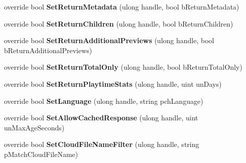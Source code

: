 \begin{DoxyCompactItemize}
override bool {\bfseries Set\+Return\+Metadata} (ulong handle, bool b\+Return\+Metadata)
\item 
\mbox{\label{class_valve_1_1_steamworks_1_1_c_steam_u_g_c_ab2c1dcec4605c85bf2d314fdd65db38a}} 
override bool {\bfseries Set\+Return\+Children} (ulong handle, bool b\+Return\+Children)
\item 
\mbox{\label{class_valve_1_1_steamworks_1_1_c_steam_u_g_c_a5da0f4965e1c5c5566a0d6394645eb3e}} 
override bool {\bfseries Set\+Return\+Additional\+Previews} (ulong handle, bool b\+Return\+Additional\+Previews)
\item 
\mbox{\label{class_valve_1_1_steamworks_1_1_c_steam_u_g_c_a89c366b9fc506be0361a47e3d03e6ad0}} 
override bool {\bfseries Set\+Return\+Total\+Only} (ulong handle, bool b\+Return\+Total\+Only)
\item 
\mbox{\label{class_valve_1_1_steamworks_1_1_c_steam_u_g_c_aa8d41c78546f0f3bb6bd33e5249d777f}} 
override bool {\bfseries Set\+Return\+Playtime\+Stats} (ulong handle, uint un\+Days)
\item 
\mbox{\label{class_valve_1_1_steamworks_1_1_c_steam_u_g_c_a003c2a7ab4ff2ab5afcaa0244decfdb9}} 
override bool {\bfseries Set\+Language} (ulong handle, string pch\+Language)
\item 
\mbox{\label{class_valve_1_1_steamworks_1_1_c_steam_u_g_c_a5a9a18915162b132f8a34b5c5b6baadd}} 
override bool {\bfseries Set\+Allow\+Cached\+Response} (ulong handle, uint un\+Max\+Age\+Seconds)
\item 
\mbox{\label{class_valve_1_1_steamworks_1_1_c_steam_u_g_c_a5ab703bf967992d0b30f5076eded4944}} 
override bool {\bfseries Set\+Cloud\+File\+Name\+Filter} (ulong handle, string p\+Match\+Cloud\+File\+Name)
\item 
\mbox{\label{class_valve_1_1_steamworks_1_1_c_steam_u_g_c_af061dbae6f2db64d161c0031af567cf4}} 

\end{DoxyCompactItemize}

